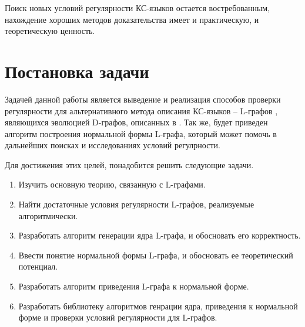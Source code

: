 Поиск новых условий регулярности КС-языков остается востребованным, нахождение
хороших методов доказательства имеет и практическую, и теоретическую ценность. 

\section{Постановка задачи}

Задачей данной работы является выведение и реализация способов проверки регулярности для альтернативного 
метода описания КС-языков -- L-графов \cite{vylitok_rostovski_o_podklassah,vylitok_sutirin_harakterizacia}, 
являющихся эволюцией D-графов, описанных в \cite{stan1}. Так же, будет приведен алгоритм построения нормальной формы
L-графа, который может помочь в дальнейших поисках и исследованиях условий регулрности.

Для достижения этих целей, понадобится решить следующие задачи.

\begin{enumerate}
    \item Изучить основную теорию, связанную с L-графами.
    \item Найти достаточные условия регулярности L-графов, реализуемые алгоритмически.
    \item Разработать алгоритм генерации ядра L-графа, и обосновать его корректность.
    \item Ввести понятие нормальной формы L-графа, и обосновать ее теоретический потенциал.
    \item Разработать алгоритм приведения L-графа к нормальной форме.
    \item Разработать библиотеку алгоритмов генрации ядра, приведения к нормальной форме и проверки условий регулярности для L-графов. 
\end{enumerate}

\clearpage
